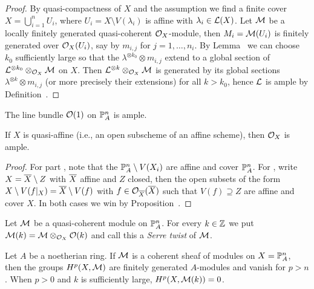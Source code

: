 \documentclass[a4paper,parskip=half,numbers=enddot, DIV=12]{scrreprt}
\begin{document}
\begin{proof}
	By quasi-compactness of $X$ and the assumption we find a finite cover $X=\bigcup_{i=1}^nU_i$, where $U_i=X\setminus V(\lambda_i)$ is affine with $\lambda_i\in \mathcal{L}(X)$. Let $\mathcal{M}$ be a locally finitely generated quasi-coherent $\mathcal{O}_X$-module, then $M_i=\mathcal{M}(U_i)$ is finitely generated over $\mathcal{O}_X(U_i)$, say by $m_{i,j}$ for $j=1,\ldots,n_i$. By Lemma~ we can choose $k_0$ sufficiently large so that the $\lambda^{\otimes k_0}\otimes m_{i,j}$ extend to a global section of $\mathcal{L}^{\otimes k_0}\otimes_{\mathcal{O}_X}\mathcal{M}$ on $X$. Then $\mathcal{L}^{\otimes k}\otimes_{\mathcal{O}_X}\mathcal{M}$ is generated by its global sections $\lambda^{\otimes k}\otimes m_{i,j}$ (or more precisely their extensions) for all $k>k_0$, hence $\mathcal{L}$ is ample by Definition~.
\end{proof}
\begin{cor}
	\begin{alphanumerate}
		\item {}The line bundle $\mathcal{O}(1)$ on $\mathbb{P}_A^n$ is ample.
		\item If $X$ is quasi-affine (i.e., an open subscheme of an affine scheme), then $\mathcal{O}_X$ is ample.
	\end{alphanumerate}
\end{cor}
\begin{proof}
	For part , note that the $\mathbb{P}_A^n\setminus V(X_i)$ are affine and cover $\mathbb{P}_A^n$. For , write $X=\overline{X}\setminus Z$ with $\overline{X}$ affine and $Z$ closed, then the open subsets of the form $X\setminus V(f|_X)=\overline{X}\setminus V(f)$ with $f\in\mathcal{O}_{\overline{X}}(\overline{X})$ such that $V(f)\supseteq Z$ are affine and cover $X$. In both cases we win by Proposition~.
\end{proof}
Let $\mathcal{M}$ be a quasi-coherent module on $\mathbb{P}_A^n$. For every $k\in \mathbb{Z}$ we put $\mathcal{M}(k)=\mathcal{M}\otimes_{\mathcal{O}_X}\mathcal{O}(k)$ and call this a \emph{Serre twist} of $\mathcal{M}$.
\begin{thm}[Serre]
	Let $A$ be a noetherian ring. If $\mathcal{M}$ is a coherent sheaf of modules on $X=\mathbb{P}_A^n$, then the groups $H^p(X,\mathcal{M})$ are finitely generated $A$-modules and vanish for $p>n$. When $p>0$ and $k$ is sufficiently large, $H^p(X,\mathcal{M}(k))=0$.
\end{thm}
\end{document}
